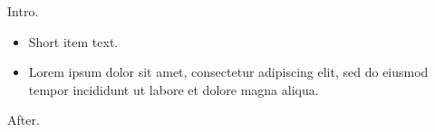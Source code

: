 \documentclass[10pt]{article}
\begin{document}
Intro.
\begin{itemize}
\item[--] Short item text.
\item[(x)] Lorem ipsum dolor sit amet, consectetur adipiscing elit, sed do eiusmod tempor incididunt ut labore et dolore magna aliqua.
\end{itemize}
After.
\end{document}
